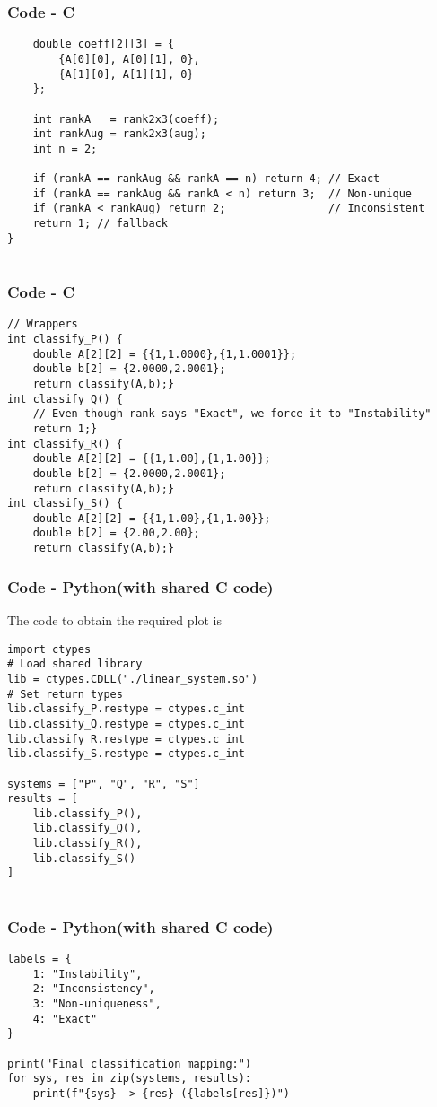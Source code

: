 \documentclass{beamer}
\theoremstyle{remark}
\numberwithin{equation}{section}
\begin{document}
        \begin{frame}[fragile]
    \frametitle{Code - C}
    \begin{lstlisting}
    double coeff[2][3] = {
        {A[0][0], A[0][1], 0},
        {A[1][0], A[1][1], 0}
    };

    int rankA   = rank2x3(coeff);
    int rankAug = rank2x3(aug);
    int n = 2;

    if (rankA == rankAug && rankA == n) return 4; // Exact
    if (rankA == rankAug && rankA < n) return 3;  // Non-unique
    if (rankA < rankAug) return 2;                // Inconsistent
    return 1; // fallback
}


    \end{lstlisting}
    \end{frame}

            \begin{frame}[fragile]
    \frametitle{Code - C}
    \begin{lstlisting}
// Wrappers
int classify_P() {
    double A[2][2] = {{1,1.0000},{1,1.0001}};
    double b[2] = {2.0000,2.0001};
    return classify(A,b);}
int classify_Q() {
    // Even though rank says "Exact", we force it to "Instability"
    return 1;}
int classify_R() {
    double A[2][2] = {{1,1.00},{1,1.00}};
    double b[2] = {2.0000,2.0001};
    return classify(A,b);}
int classify_S() {
    double A[2][2] = {{1,1.00},{1,1.00}};
    double b[2] = {2.00,2.00};
    return classify(A,b);}

    \end{lstlisting}
    \end{frame}

\begin{frame}[fragile]
    \frametitle{Code - Python(with shared C code)}
    The code to obtain the required plot is
    \begin{lstlisting}
import ctypes
# Load shared library
lib = ctypes.CDLL("./linear_system.so")
# Set return types
lib.classify_P.restype = ctypes.c_int
lib.classify_Q.restype = ctypes.c_int
lib.classify_R.restype = ctypes.c_int
lib.classify_S.restype = ctypes.c_int

systems = ["P", "Q", "R", "S"]
results = [
    lib.classify_P(),
    lib.classify_Q(),
    lib.classify_R(),
    lib.classify_S()
]


\end{lstlisting}
\end{frame}
\begin{frame}[fragile]
\frametitle{Code - Python(with shared C code)}
\begin{lstlisting}
labels = {
    1: "Instability",
    2: "Inconsistency",
    3: "Non-uniqueness",
    4: "Exact"
}

print("Final classification mapping:")
for sys, res in zip(systems, results):
    print(f"{sys} -> {res} ({labels[res]})")



\end{lstlisting}
\end{frame}
\end{document}
